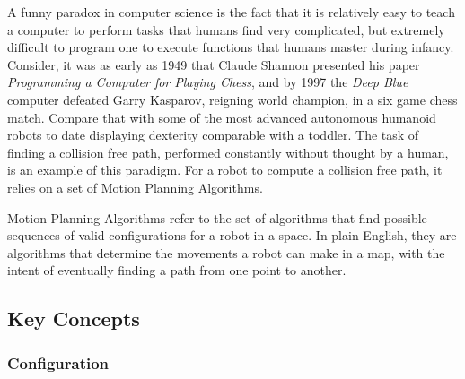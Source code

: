 
A funny paradox in computer science is the fact that it is relatively easy to teach a computer to perform tasks that humans find very complicated, but extremely difficult to program one to execute functions that humans master during infancy. Consider, it was as early as 1949 that Claude Shannon presented his paper \textit{Programming a Computer for Playing Chess}\cite{Shannon1950}, and by 1997 the \textit{Deep Blue} computer defeated Garry Kasparov, reigning world champion, in a six game chess match.\cite{Campbell2002} Compare that with some of the most advanced autonomous humanoid robots to date displaying dexterity comparable with a toddler. The task of finding a collision free path, performed constantly without thought by a human, is an example of this paradigm. For a robot to compute a collision free path, it relies on a set of Motion Planning Algorithms.

Motion Planning Algorithms refer to the set of algorithms that find possible sequences of valid \gls{configuration}s for a robot in a space. In plain English, they are algorithms that determine the movements a robot can make in a map, with the intent of eventually finding a path from one point to another. 

\subsection{Key Concepts}

    \subsubsection{Configuration}

    


